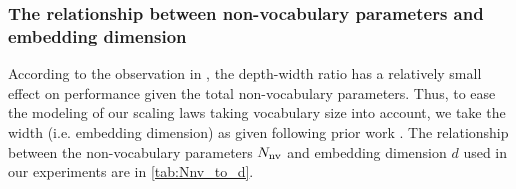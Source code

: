 \subsubsection{The relationship between non-vocabulary parameters and embedding dimension}
\label{append:Nnv-d}
According to the observation in \citet{kaplan2020scaling}, the depth-width ratio has a relatively small effect on performance given the total non-vocabulary parameters. Thus, to ease the modeling of our scaling laws taking vocabulary size into account, we take the width (i.e. embedding dimension) as given following prior work \citep{kaplan2020scaling,hoffmann2022training,muennighoff2024scaling,touvron2023llama,zhang2024tinyllama}. The relationship between the non-vocabulary parameters $N_{\rm nv}$ and embedding dimension $d$ used in our experiments are in \autoref{tab:Nnv_to_d}.
\begin{table}[ht]
\centering
\caption{The relationship between the non-vocabulary parameters $N_{\rm nv}$ and the embedding dimension used in our experiments.}
\label{tab:Nnv_to_d}
\end{table}

